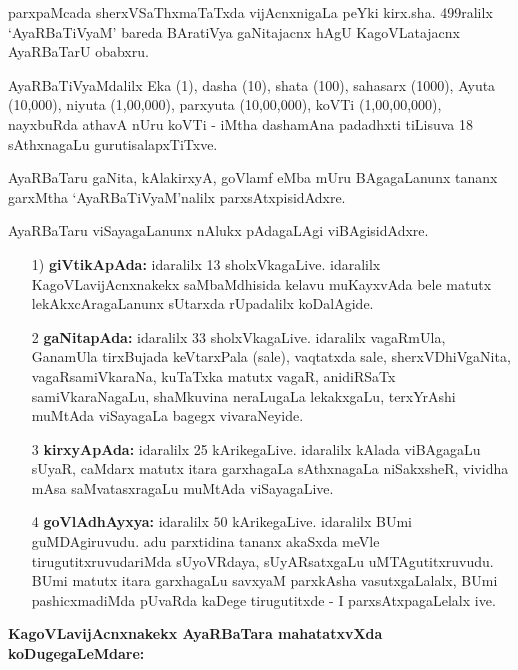 parxpaMcada sherxVSaThxmaTaTxda vijAcnxnigaLa peYki kirx.sha. {\rm 499}ralilx `AyaRBaTiVyaM' bareda BAratiVya gaNitajacnx hAgU KagoVLatajacnx AyaRBaTarU obabxru.

AyaRBaTiVyaMdalilx Eka ({\rm 1}), dasha ({\rm 10}), shata ({\rm 100}), sahasarx ({\rm 1000}), Ayuta ({\rm 10,000}), niyuta ({\rm 1,00,000}), parxyuta ({\rm 10,00,000}), koVTi ({\rm 1,00,00,000}), nayxbuRda athavA nUru koVTi - iMtha dashamAna padadhxti tiLisuva {\rm 18} sAthxnagaLu gurutisalapxTiTxve.


AyaRBaTaru gaNita, kAlakirxyA, goVlamf eMba mUru BAgagaLanunx tananx garxMtha `AyaRBaTiVyaM'nalilx parxsAtxpisidAdxre.

AyaRBaTaru viSayagaLanunx nAlukx pAdagaLAgi viBAgisidAdxre.
\begin{itemize}
\item[{\rm 1)}] {\bf giVtikApAda:} idaralilx {\rm 13} sholxVkagaLive. idaralilx KagoVLavijAcnxnakekx saMbaMdhisida kelavu muKayxvAda bele matutx lekAkxcAragaLanunx sUtarxda rUpadalilx koDalAgide.

\item[{\rm 2}] {\bf gaNitapAda:} idaralilx {\rm 33} sholxVkagaLive. idaralilx vagaRmUla, GanamUla tirxBujada keVtarxPala (sale), vaqtatxda sale, sherxVDhiVgaNita, vagaRsamiVkaraNa, kuTaTxka matutx vagaR, anidiRSaTx samiVkaraNagaLu, shaMkuvina neraLugaLa lekakxgaLu, terxYrAshi muMtAda viSayagaLa bagegx vivaraNeyide. 
  
\item[{\rm 3}] {\bf kirxyApAda:} idaralilx {\rm 25} kArikegaLive. idaralilx kAlada viBAgagaLu sUyaR, caMdarx matutx itara garxhagaLa sAthxnagaLa niSakxsheR, vividha mAsa saMvatasxragaLu muMtAda viSayagaLive.
 
\item[{\rm 4}] {\bf goVlAdhAyxya:} idaralilx $50$ kArikegaLive. idaralilx BUmi guMDAgiru\-vudu. adu parxtidina tananx akaSxda meVle tirugutitxruvudariMda sUyoVR\-daya, sUyARsatxgaLu uMTAgutitxruvudu. BUmi matutx itara garxhagaLu savxyaM parxkAsha vasutxgaLalalx, BUmi pashicxmadiMda pUvaRda kaDege tirugutitxde - I parxsAtxpagaLelalx ive.
  \end{itemize}

\eject

\noindent
{\bf KagoVLavijAcnxnakekx AyaRBaTara mahatatxvXda koDugegaLeMdare:}

